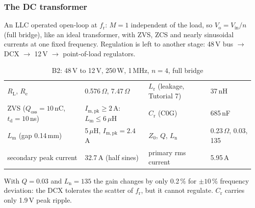 \begin{frame}
	\frametitle{The DC transformer}
	\small
	An LLC operated open-loop at $f_\mathrm{r}$: $M=1$ independent of the load, so $V_\mathrm{o}=V_\mathrm{in}/n$ (full bridge), like an ideal transformer, with ZVS, ZCS and nearly sinusoidal currents at one fixed frequency. Regulation is left to another stage: 48\,V bus $\rightarrow$ DCX $\rightarrow$ 12\,V $\rightarrow$ point-of-load regulators.
	\begin{table}
		\centering
		\scriptsize
		\begin{tabular}{|l|l|l|l|}
			\hline
			$R_\mathrm{L}$, $R_\mathrm{e}$                         & 0.576\,$\Omega$, 7.47\,$\Omega$                       & $L_\mathrm{r}$ (leakage, Tutorial 7) & 37\,nH                    \\
			ZVS ($Q_\mathrm{oss}=10$\,nC, $t_\mathrm{d}=10$\,ns) & $I_\mathrm{m,pk}\geq2$\,A: $L_\mathrm{m}\leq6\,\mu$H & $C_\mathrm{r}$ (C0G)                 & 685\,nF                   \\
			$L_\mathrm{m}$ (gap 0.14\,mm)                         & 5\,$\mu$H, $I_\mathrm{m,pk}=2.4$\,A                  & $Z_0$, $Q$, $L_\mathrm{n}$           & 0.23\,$\Omega$, 0.03, 135  \\
			secondary peak current                                & 32.7\,A (half sines)                                 & primary rms current                  & 5.95\,A                   \\
			\hline
		\end{tabular}
		\caption{B2: 48\,V to 12\,V, 250\,W, 1\,MHz, $n=4$, full bridge}
	\end{table}
	With $Q=0.03$ and $L_\mathrm{n}=135$ the gain changes by only 0.2\,\% for $\pm10$\,\% frequency deviation: the DCX tolerates the scatter of $f_\mathrm{r}$, but it cannot regulate. $C_\mathrm{r}$ carries only 1.9\,V peak ripple.
\end{frame}

